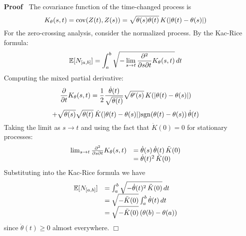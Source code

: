 \documentclass{article}
\newenvironment{proof}{\noindent\textbf{Proof\ }}{\hspace*{\fill}$\Box$\medskip}
\begin{document}
\begin{proof}
  The covariance function of the time-changed process is
  \begin{equation}
    \label{eq:time_changed_cov} K_{\theta} (s, t) = \mathrm{cov} (Z (t), Z
    (s)) = \sqrt{\theta (s) \theta (t)}  \hspace{0.17em} K (| \theta (t) -
    \theta (s) |)
  \end{equation}
  For the zero-crossing analysis, consider the normalized process. By the
  Kac-Rice formula:
  \begin{equation}
    \label{eq:kac_rice_formula} \mathbb{E} [N_{[a, b]}] = \int_a^b \sqrt{-
    \lim_{s \to t}  \frac{\partial^2}{\partial s \partial t} K_{\theta} (s,
    t)}  \hspace{0.17em} dt
  \end{equation}
  Computing the mixed partial derivative:
  \begin{equation}
    \label{eq:mixed_partial} \frac{\partial}{\partial t} K_{\theta} (s, t) =
    \frac{1}{2}  \frac{\dot{\theta} (t)}{\sqrt{\theta (t)}}  \sqrt{\theta'
    (s)}  \hspace{0.17em} K (| \theta (t) - \theta (s) |)
  \end{equation}
  \begin{equation}
    \label{eq:mixed_partial_continued} + \sqrt{\theta (s)}  \sqrt{\theta (t)} 
    \hspace{0.17em} \dot{K} (| \theta (t) - \theta (s) |) \mathrm{sgn} (\theta
    (t) - \theta (s))  \hspace{0.17em} \dot{\theta} (t)
  \end{equation}
  Taking the limit as $s \to t$ and using the fact that $\dot{K} (0) = 0$ for
  stationary processes:
  \begin{equation}
    \begin{array}{ll}
      \lim_{s \to t}  \frac{\partial^2}{\partial s \partial t} K_{\theta} (s,
      t) & = \dot{\theta} (s) \hspace{0.17em} \dot{\theta} (t) 
      \hspace{0.17em} \ddot{K} (0)\\
      & = \dot{\theta} (t)^2  \hspace{0.17em} \ddot{K} (0)
    \end{array} \label{eq:limit_mixed_partial}
  \end{equation}
  Substituting into the Kac-Rice formula we have
  \begin{equation}
    \label{eq:substituted_kac_rice} \begin{array}{ll}
      \mathbb{E} [N_{[a, b]}] & = \int_a^b \sqrt{- \dot{\theta} (t)^2 
      \hspace{0.17em} \ddot{K} (0)}  \hspace{0.17em} dt\\
      & = \sqrt{- \ddot{K} (0)}  \int_a^b \dot{\theta} (t)  \hspace{0.17em}
      dt\\
      & = \sqrt{- \ddot{K} (0)}  \hspace{0.17em} (\theta (b) - \theta (a))
    \end{array}
  \end{equation}
  since $\dot{\theta} (t) \geq 0$ almost everywhere.
\end{proof}
\end{document}
